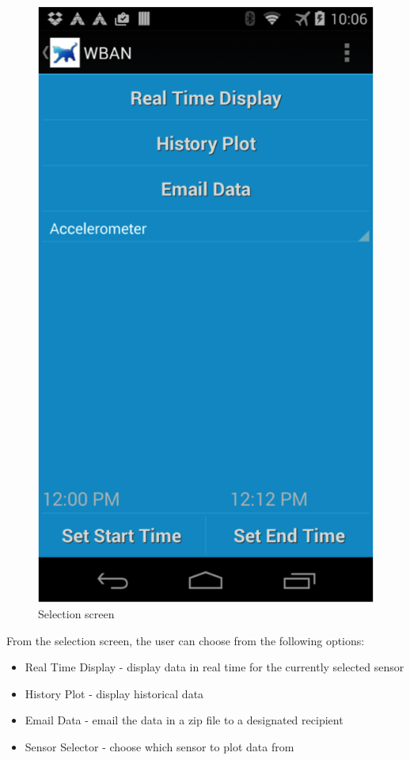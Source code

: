 \documentclass{article}
\begin{document}
\begin{figure}[!h]
  \centering
  \includegraphics[width=\WID]{pics/select.png}
  \caption{Selection screen}
  \label{fig:select}
\end{figure}

From the selection screen, the user can choose from the following options:

\begin{itemize}
\item Real Time Display - display data in real time for the currently selected sensor
\item History Plot - display historical data 
\item Email Data - email the data in a zip file to a designated recipient
\item Sensor Selector - choose which sensor to plot data from
\end{itemize}
\end{document}
